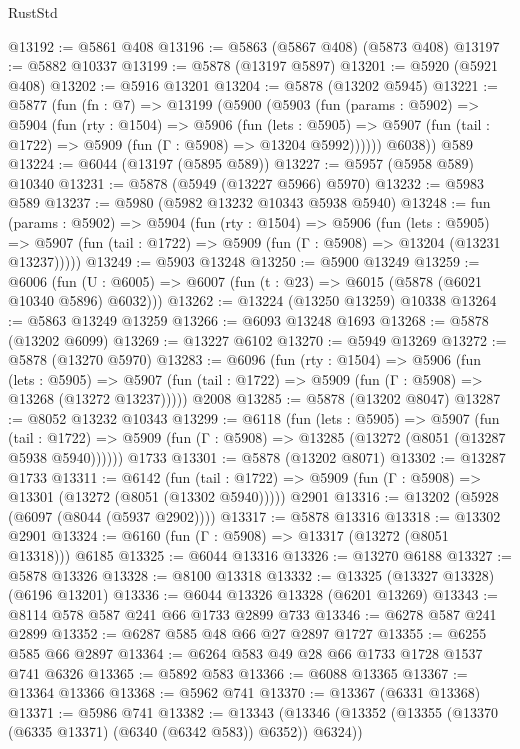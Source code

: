 \begin{lexlean}{RustStd}
\begin{coremodule}
@13192 := @5861 @408
@13196 := @5863 (@5867 @408) (@5873 @408)
@13197 := @5882 @10337
@13199 := @5878 (@13197 @5897)
@13201 := @5920 (@5921 @408)
@13202 := @5916 @13201
@13204 := @5878 (@13202 @5945)
@13221 := @5877
    (fun (fn : @7) =>
    @13199
      (@5900
        (@5903
          (fun (params : @5902) =>
          @5904
            (fun (rty : @1504) =>
            @5906
              (fun (lets : @5905) =>
              @5907 (fun (tail : @1722) => @5909 (fun (Γ : @5908) => @13204 @5992))))))
        @6038))
    @589
@13224 := @6044 (@13197 (@5895 @589))
@13227 := @5957 (@5958 @589) @10340
@13231 := @5878 (@5949 (@13227 @5966) @5970)
@13232 := @5983 @589
@13237 := @5980 (@5982 @13232 @10343 @5938 @5940)
@13248 := fun (params : @5902) =>
  @5904
    (fun (rty : @1504) =>
    @5906
      (fun (lets : @5905) =>
      @5907 (fun (tail : @1722) => @5909 (fun (Γ : @5908) => @13204 (@13231 @13237)))))
@13249 := @5903 @13248
@13250 := @5900 @13249
@13259 := @6006
    (fun (U : @6005) => @6007 (fun (t : @23) => @6015 (@5878 (@6021 @10340 @5896) @6032)))
@13262 := @13224 (@13250 @13259) @10338
@13264 := @5863 @13249 @13259
@13266 := @6093 @13248 @1693
@13268 := @5878 (@13202 @6099)
@13269 := @13227 @6102
@13270 := @5949 @13269
@13272 := @5878 (@13270 @5970)
@13283 := @6096
    (fun (rty : @1504) =>
    @5906
      (fun (lets : @5905) =>
      @5907 (fun (tail : @1722) => @5909 (fun (Γ : @5908) => @13268 (@13272 @13237)))))
    @2008
@13285 := @5878 (@13202 @8047)
@13287 := @8052 @13232 @10343
@13299 := @6118
    (fun (lets : @5905) =>
    @5907
      (fun (tail : @1722) =>
      @5909 (fun (Γ : @5908) => @13285 (@13272 (@8051 (@13287 @5938 @5940))))))
    @1733
@13301 := @5878 (@13202 @8071)
@13302 := @13287 @1733
@13311 := @6142
    (fun (tail : @1722) => @5909 (fun (Γ : @5908) => @13301 (@13272 (@8051 (@13302 @5940)))))
    @2901
@13316 := @13202 (@5928 (@6097 (@8044 (@5937 @2902))))
@13317 := @5878 @13316
@13318 := @13302 @2901
@13324 := @6160 (fun (Γ : @5908) => @13317 (@13272 (@8051 @13318))) @6185
@13325 := @6044 @13316
@13326 := @13270 @6188
@13327 := @5878 @13326
@13328 := @8100 @13318
@13332 := @13325 (@13327 @13328) (@6196 @13201)
@13336 := @6044 @13326 @13328 (@6201 @13269)
@13343 := @8114 @578 @587 @241 @66 @1733 @2899 @733
@13346 := @6278 @587 @241 @2899
@13352 := @6287 @585 @48 @66 @27 @2897 @1727
@13355 := @6255 @585 @66 @2897
@13364 := @6264 @583 @49 @28 @66 @1733 @1728 @1537 @741 @6326
@13365 := @5892 @583
@13366 := @6088 @13365
@13367 := @13364 @13366
@13368 := @5962 @741
@13370 := @13367 (@6331 @13368)
@13371 := @5986 @741
@13382 := @13343 (@13346 (@13352 (@13355 (@13370 (@6335 @13371) (@6340 (@6342 @583)) @6352)) @6324))

\end{coremodule}
\end{lexlean}
